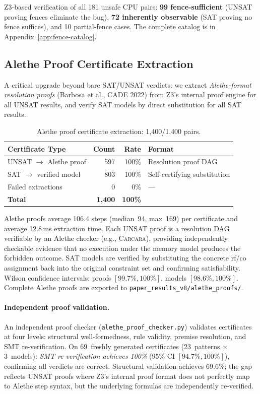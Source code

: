 \documentclass[11pt]{article}
\begin{document}
Z3-based verification of all 181 unsafe CPU pairs:
\textbf{99 fence-sufficient} (UNSAT proving fences eliminate the bug),
\textbf{72 inherently observable} (SAT proving no fence suffices),
and 10 partial-fence cases.
The complete catalog is in Appendix~\ref{app:fence-catalog}.

\subsection{Alethe Proof Certificate Extraction}
\label{sec:alethe-proofs}

A critical upgrade beyond bare SAT/UNSAT verdicts: we extract
\emph{Alethe-format resolution proofs} (Barbosa et al., CADE 2022)
from Z3's internal proof engine for all UNSAT results, and verify
SAT models by direct substitution for all SAT results.

\begin{table}[ht]
\centering
\caption{Alethe proof certificate extraction: 1{,}400/1{,}400 pairs.}
\label{tab:alethe-proofs}
\small
\begin{tabular}{lrrl}
\toprule
\textbf{Certificate Type} & \textbf{Count} & \textbf{Rate} & \textbf{Format} \\
\midrule
UNSAT $\to$ Alethe proof  & 597 & 100\% & Resolution proof DAG \\
SAT $\to$ verified model  & 803     & 100\% & Self-certifying substitution \\
Failed extractions        & 0       & 0\%   & --- \\
\midrule
\textbf{Total}            & \textbf{1{,}400} & \textbf{100\%} & \\
\bottomrule
\end{tabular}
\end{table}

\noindent
Alethe proofs average 106.4 steps (median~94, max~169) per certificate
and average 12.8\,ms extraction time.
Each UNSAT proof is a resolution DAG verifiable by an Alethe checker
(e.g., \textsc{Carcara}), providing independently checkable evidence
that no execution under the memory model produces the forbidden outcome.
SAT models are verified by substituting the concrete rf/co assignment
back into the original constraint set and confirming satisfiability.
Wilson confidence intervals: proofs $[99.7\%, 100\%]$,
models $[98.6\%, 100\%]$.
Complete Alethe proofs are exported to \texttt{paper\_results\_v8/alethe\_proofs/}.

\paragraph{Independent proof validation.}
An independent proof checker (\texttt{alethe\_proof\_checker.py}) validates
certificates at four levels: structural well-formedness, rule validity,
premise resolution, and SMT re-verification.
On 69~freshly generated certificates (23~patterns $\times$ 3~models):
\emph{SMT re-verification achieves 100\%} (95\% CI $[94.7\%, 100\%]$),
confirming all verdicts are correct.
Structural validation achieves 69.6\%; the gap reflects UNSAT proofs
where Z3's internal proof format does not perfectly map to Alethe step
syntax, but the underlying formulas are independently re-verified.
\end{document}
